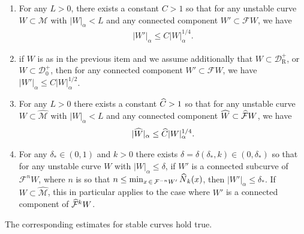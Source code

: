 \documentclass[AHL, Unicode, longabstracts,published]{cedram}
\newcommand{\cm}{\mathcal{F}}
\newcommand{\cell}{\mathcal{D}}
\newcommand{\csp}{\mathcal{M}}
\newcommand{\cmp}{\hat\cm}
\newcommand{\cspi}{\widehat{\csp}}
\newcommand{\recoPrivate}{\mathrm{R}}
\newcommand{\backReco}{{\cell^+_{\recoPrivate}}}
\newcommand{\adm}{_{\alpha^{+}}}
\newcommand{\Np}{\hat N}
\renewcommand{\adm}{_{\alpha}}
\newcommand*{\relabel}{\renewcommand{\labelenumi}{(\theenumi)}}
\newcommand*{\alphenumi}{\renewcommand*{\theenumi}{\alph{enumi}}\relabel}
\let\oldhat\hat
\renewcommand*{\hat}[1]{\mathchoice{\widehat{#1}}{\widehat{#1}}{\oldhat{#1}}{\oldhat{#1}}}
\begin{document}
\begin{lemm}\label{l_globalExpansion}
\leavevmode
\begin{enumerate}\alphenumi
\item\label{lemm4.25.1} For any $L > 0$, there exists a constant $C > 1$ so that for any unstable curve $W\subset\csp$ with $|W|\adm < L$ and any connected component $W'\subset \cm W$, we have
\begin{align}\label{e_globalExpansion}
|W'|\adm\le C|W|\adm^{1/4}.
\end{align}
\item\label{lemm4.25.2} if $W$ is as in the previous item and we assume additionally that $W\subset\backReco$, or $W\subset \cell_{0}^{+}$, then for any connected component $W'\subset\cm W$, we have $|W'|\adm \le C|W|\adm^{1/2}$.

\item\label{lemm4.25.3} For any $L > 0$ there exists a constant $\hat C > 1$ so that for any unstable curve $W\subset\cspi$ with $|W|\adm < L$ and any connected component $\hat W\subset \cmp W$, we have
\begin{align*}
|\hat W|\adm \le \hat C|W|\adm^{1/4}.
\end{align*}
\item\label{lemm4.25.4} For any $\delta_{*} \in(0,1)$ and $k > 0$ there exists $\delta =\delta(\delta_{*}, k)\in(0,\delta_{*})$ so that for any unstable curve $W$ with $|W|\adm\le \delta$, if $W'$ is a connected subcurve of $\cm^{n}W$, where $n$ is so that $n\le\min_{x\,\in\,\cm^{-n}W'}\Np_{k}(x)$, then $|W'|\adm\le \delta_*$. If $W\subset\cspi$, this in particular applies to the case where $W'$ is a connected component of $\cmp^{k}W$.
\end{enumerate}
The corresponding estimates for stable curves hold true.
\end{lemm}
\end{document}
